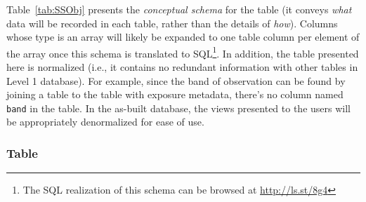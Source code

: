 Table~\ref{tab:SSObj}  presents the {\em conceptual schema} for the \SSObject table (it conveys {\em what} data
will be recorded in each table, rather than the details of {\em how}). 
Columns whose type is an array will likely be expanded to one table column per element of the array
once this schema is translated to SQL\footnote{The SQL realization of this schema can be browsed at \url{http://ls.st/8g4}}. In addition, the table presented here is normalized (i.e., it contains no redundant 
information with other tables in Level 1 database). For example, since the band of observation can be found 
by joining a \DIASource table to the table with exposure metadata, there's no column named {\tt band} in the \DIASource table. In the as-built database, the views presented to the users will be appropriately denormalized 
for ease of use.

\subsubsection{\SSObject Table \label{tab:SSObj}}

